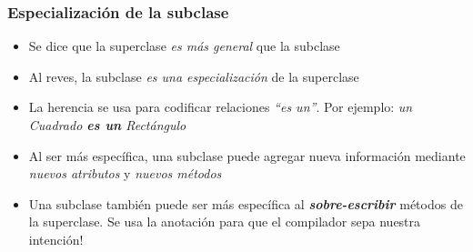 \documentclass{beamer}
\begin{document}
\begin{frame}
  \frametitle{Especialización de la subclase}

  \begin{itemize}
  \item Se dice que la superclase \emph{es más general} que la
    subclase
    
  \item Al reves, la subclase \emph{es una especialización} de la
    superclase
    
  \item La herencia se usa para codificar relaciones \emph{``es
      un''}. Por ejemplo: \emph{un Cuadrado \textbf{es un} Rectángulo}
    
  \item Al ser más específica, una subclase puede agregar nueva
    información mediante \emph{nuevos atributos} y \emph{nuevos
      métodos}
    
  \item Una subclase también puede ser más específica al
    \textbf{\textit{sobre-escribir}} métodos de la superclase. Se usa
    la anotación  para que el compilador sepa nuestra
    intención!
    
  \end{itemize}
\end{frame}
\end{document}
